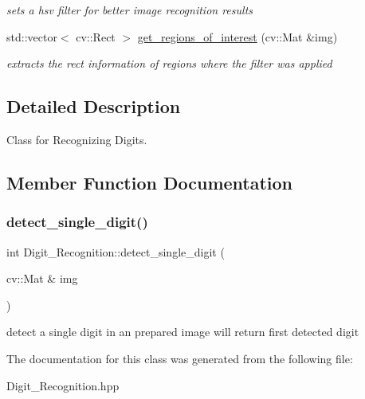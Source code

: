 \begin{DoxyCompactItemize}
\begin{DoxyCompactList}\small\item\em sets a hsv filter for better image recognition results \end{DoxyCompactList}\item 
\mbox{\label{class_digit___recognition_acb87e2fb3a72d625170ab8c95ef6828f}} 
std\+::vector$<$ cv\+::\+Rect $>$ \mbox{\hyperlink{class_digit___recognition_acb87e2fb3a72d625170ab8c95ef6828f}{get\+\_\+regions\+\_\+of\+\_\+interest}} (cv\+::\+Mat \&img)
\begin{DoxyCompactList}\small\item\em extracts the rect information of regions where the filter was applied \end{DoxyCompactList}\end{DoxyCompactItemize}


\subsection{Detailed Description}
Class for Recognizing Digits. 

\subsection{Member Function Documentation}
\mbox{\label{class_digit___recognition_adc3ce374dcfcbf4b58b645a7ec95e725}} 
\subsubsection{\texorpdfstring{detect\+\_\+single\+\_\+digit()}{detect\_single\_digit()}}
{\footnotesize\ttfamily int Digit\+\_\+\+Recognition\+::detect\+\_\+single\+\_\+digit (\begin{DoxyParamCaption}\item[{cv\+::\+Mat \&}]{img }\end{DoxyParamCaption})}

detect a single digit in an prepared image will return first detected digit 

The documentation for this class was generated from the following file\+:\begin{DoxyCompactItemize}
\item 
Digit\+\_\+\+Recognition.\+hpp\end{DoxyCompactItemize}
